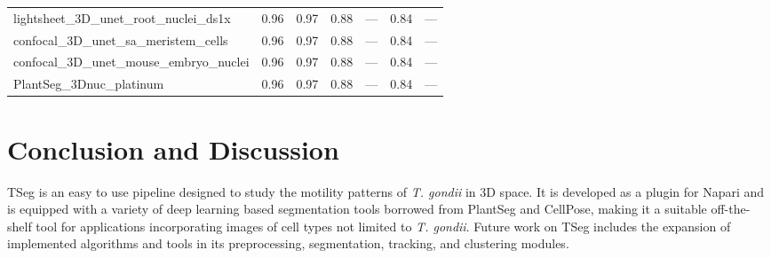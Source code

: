 \documentclass[./dissertation.tex]{subfiles}
\begin{document}
\begin{table}
\begin{tabular}{|l|c|c|c|c|c|c|}
        lightsheet\_3D\_unet\_root\_nuclei\_ds1x  & 0.96                                    & 0.97                                        & 0.88                                    & ---                                   & 0.84                                   & ---                                     \\
        confocal\_3D\_unet\_sa\_meristem\_cells   & 0.96                                    & 0.97                                        & 0.88                                    & ---                                   & 0.84                                   & ---                                     \\
        confocal\_3D\_unet\_mouse\_embryo\_nuclei & 0.96                                    & 0.97                                        & 0.88                                    & ---                                   & 0.84                                   & ---                                     \\
        PlantSeg\_3Dnuc\_platinum                 & 0.96                                    & 0.97                                        & 0.88                                    & ---                                   & 0.84                                   & ---                                     \\
        \bottomrule
    \end{tabular}
\end{table}


\section{Conclusion and Discussion}
TSeg is an easy to use pipeline designed to study the motility patterns of \textit{T. gondii} in 3D space. It is developed as a plugin for Napari and is equipped with a variety of deep learning based segmentation tools borrowed from PlantSeg and CellPose, making it a suitable off-the-shelf tool for applications incorporating images of cell types not limited to \textit{T. gondii}. Future work on TSeg includes the expansion of implemented algorithms and tools in its preprocessing, segmentation, tracking, and clustering modules.
\end{document}
